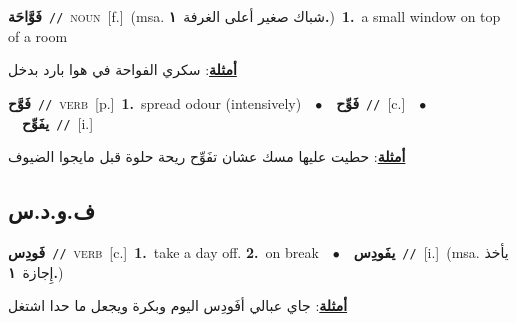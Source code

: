 \documentclass[10pt,a4paper,twoside]{article} %
\begin{document}
\begin{multicols}{2}
{\setlength\topsep{0pt}\textbf{\foreignlanguage{arabic}{فَوَّاحَة}}\ {\color{gray}\texttt{//}\color{black}}\ \textsc{noun}\ [f.]\ \color{gray}(msa. \foreignlanguage{arabic}{شباك صغير أعلى الغرفة}~\foreignlanguage{arabic}{\textbf{١.}})\color{black}\ \textbf{1.}~a small window on top of a room\  \begin{flushright}\color{gray}\foreignlanguage{arabic}{\textbf{\underline{\foreignlanguage{arabic}{أمثلة}}}: سكري الفواحة في هوا بارد بدخل}\end{flushright}\color{black}} \vspace{2mm}

{\setlength\topsep{0pt}\textbf{\foreignlanguage{arabic}{فَوَّح}}\ {\color{gray}\texttt{//}\color{black}}\ \textsc{verb}\ [p.]\ \textbf{1.}~spread odour (intensively)\ \ $\bullet$\ \ \setlength\topsep{0pt}\textbf{\foreignlanguage{arabic}{فَوِّح}}\ {\color{gray}\texttt{//}\color{black}}\ [c.]\ \ $\bullet$\ \ \setlength\topsep{0pt}\textbf{\foreignlanguage{arabic}{يفَوِّح}}\ {\color{gray}\texttt{//}\color{black}}\ [i.]\  \begin{flushright}\color{gray}\foreignlanguage{arabic}{\textbf{\underline{\foreignlanguage{arabic}{أمثلة}}}: حطيت عليها مسك عشان تفَوِّح ريحة حلوة قبل مايجوا الضيوف}\end{flushright}\color{black}} \vspace{2mm}

\vspace{-3mm}
\subsection*{\color{blue}\foreignlanguage{arabic}{ف.و.د.س}\color{blue}{}} 

{\setlength\topsep{0pt}\textbf{\foreignlanguage{arabic}{فَودِس}}\ {\color{gray}\texttt{//}\color{black}}\ \textsc{verb}\ [c.]\ \textbf{1.}~take a day off.  \textbf{2.}~on break\ \ $\bullet$\ \ \setlength\topsep{0pt}\textbf{\foreignlanguage{arabic}{يفَودِس}}\ {\color{gray}\texttt{//}\color{black}}\ [i.]\ \color{gray}(msa. \foreignlanguage{arabic}{يأخذ إِجازة}~\foreignlanguage{arabic}{\textbf{١.}})\color{black}\  \begin{flushright}\color{gray}\foreignlanguage{arabic}{\textbf{\underline{\foreignlanguage{arabic}{أمثلة}}}: جاي عبالي أفَودِس اليوم وبكرة ويجعل ما حدا اشتغل}\end{flushright}\color{black}} \vspace{2mm}


\end{multicols}
\end{document}
